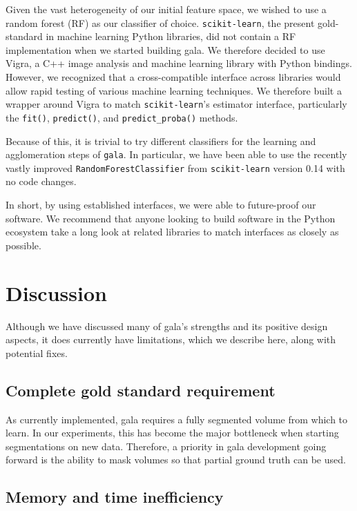 \documentclass{frontiersSCNS} %
\begin{document}
Given the vast heterogeneity of our initial feature space, we wished to use a random forest (RF) as our classifier of choice.
\texttt{\small scikit-learn}, the present gold-standard in machine learning Python libraries, did not contain a RF implementation when we started building gala.
We therefore decided to use Vigra, a C++ image analysis and machine learning library with Python bindings.
However, we recognized that a cross-compatible interface across libraries would allow rapid testing of various machine learning techniques.
We therefore built a wrapper around Vigra to match \texttt{\small scikit-learn}'s estimator interface, particularly the \texttt{\small fit()}, \texttt{\small predict()}, and \texttt{\small predict\_proba()} methods.

Because of this, it is trivial to try different classifiers for the learning and agglomeration steps of \texttt{\small gala}.
In particular, we have been able to use the recently vastly improved \texttt{\small RandomForestClassifier} from \texttt{\small scikit-learn} version 0.14 with no code changes.

In short, by using established interfaces, we were able to future-proof our software.
We recommend that anyone looking to build software in the Python ecosystem take a long look at related libraries to match interfaces as closely as possible.


\section{Discussion}

Although we have discussed many of gala's strengths and its positive design aspects, it does currently have limitations, which we describe here, along with potential fixes.

\subsection{Complete gold standard requirement}

As currently implemented, gala requires a fully segmented volume from which to learn.
In our experiments, this has become the major bottleneck when starting segmentations on new data.
Therefore, a priority in gala development going forward is the ability to mask volumes so that partial ground truth can be used.

\subsection{Memory and time inefficiency}
\end{document}
